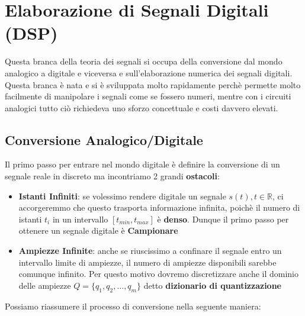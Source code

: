 \section{Elaborazione di Segnali Digitali (DSP)}
Questa branca della teoria dei segnali si occupa della conversione dal mondo analogico a digitale e viceversa
e sull'elaborazione numerica dei segnali digitali. Questa branca è nata e si è sviluppata molto rapidamente perchè
permette molto facilmente di manipolare i segnali come se fossero numeri, mentre con i circuiti analogici tutto ciò
richiedeva uno sforzo concettuale e costi davvero elevati.
\subsection{Conversione Analogico/Digitale}
Il primo passo per entrare nel mondo digitale è definire la conversione di un segnale reale in discreto ma incontriamo 2 grandi \textbf{ostacoli}:
\begin{itemize}
    \item \textbf{Istanti Infiniti}: se volessimo rendere digitale un segnale $s(t), t \in \mathbb{R}$, ci accorgeremmo che questo
    trasporta informazione infinita, poichè il numero di istanti $t_i$ in un intervallo $\left[t_{min},t_{max} \right]$ è \textbf{denso}. Dunque 
    il primo passo per ottenere un segnale digitale è \textbf{Campionare}
    \item \textbf{Ampiezze Infinite}: anche se riuscissimo a confinare il segnale entro un intervallo limite di ampiezze, il numero di ampiezze
    disponibili sarebbe comunque infinito. Per questo motivo dovremo discretizzare anche il dominio delle ampiezze $Q = \{q_1,q_2,\dots,q_m\}$ detto \textbf{dizionario di quantizzazione}
\end{itemize}
Possiamo riassumere il processo di conversione nella seguente maniera:
\begin{center}
\end{center}

